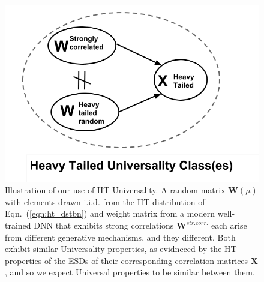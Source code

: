 
\begin{figure}[t]  %
   \centering
   \includegraphics[scale=0.40]{img/universality_classes.png} 
   \caption{Illustration of our use of HT Universality.  
            A random matrix $\mathbf{W}(\mu)$ with elements drawn i.i.d. from the HT distribution of Eqn.~(\ref{eqn:ht_dstbn}) and weight matrix from a modern well-trained DNN that exhibits strong correlations $\mathbf{W}^{str. corr.}$ each arise from different generative mechanisms, and they different.  Both exhibit similar Universality properties, as evidneced by the HT properties of the ESDs of their corresponding correlation matrices $\mathbf{X}$, and so we expect Universal properties to be similar between them.}
   \label{fig:universality_diagram}
\end{figure}



